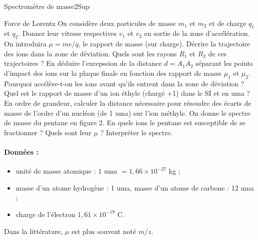 \begin{exercise}{Spectromètre de masse}{2}{Sup}
\begin{questions}
    \questioncours Force de Lorentz
    \question On considère deux particules de masse $m_1$ et $m_2$ et de charge $q_1$ et $q_2$. Donner leur vitesse respectives $v_1$ et $v_2$ en sortie de la zone d'accélération. On introduira $\mu = m e/q$, le rapport de masse (sur charge).
    \question Décrire la trajectoire des ions dans la zone de déviation. Quels sont les rayons $R_1$ et $R_2$ de ces trajectoires ?
    \question En déduire l'exrepssion de la distance $d = A_1A_2$ séparant les points d'impact des ions sur la plaque finale en fonction des rapport de masse $\mu_1$ et $\mu_2$. Pourquoi accélère-t-on les ions avant qu'ils entrent dans la zone de déviation ?
    \question Quel est le rapport de masse d'un ion éthyle (chargé +1) dans le SI et en uma ? En ordre de grandeur, calculer la distance nécessaire pour résoudre des écarts de masse de l'ordre d'un nucléon (de 1 uma) sur l'ion méthyle.
    \question On donne le spectre de masse du pentane en figure 2. En quels ions le pentane est susceptible de se fractionner ? Quels sont leur $\mu$ ? Interpréter le spectre.
\end{questions}

\paragraph{Données :}
\begin{itemize}
    \item unité de masse atomique : $1$ uma $= 1,66\times 10^{-27}$ kg ;
    \item masse d'un atome hydrogène : 1 uma, \quad masse d'un atome de carbone : 12 uma ;
    \item charge de l'électron $1,61 \times 10^{-19}$ C.
\end{itemize}
Dans la littérature, $\mu$ est plus souvent noté $m/z$.
\end{exercise}

